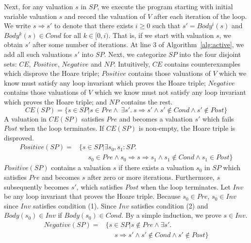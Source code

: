 Next, for any valuation $s$ in $SP$, we execute the program starting with initial variable valuation $s$ and record the valuation of $V$ after each iteration of the loop. We write $s \Rightarrow s'$ to denote that there exists $i \geq 0$ such that $s' = Body^i(s)$ and $Body^k(s) \in Cond$ for all $k \in [0, i)$. That is, if we start with valuation $s$, we obtain $s'$ after some number of iterations. At line 3 of Algorithm~\ref{alg:active}, we add all such valuations $s'$ into $SP$. Next, we categorize $SP$ into the four disjoint sets: $CE$, $Positive$, $Negative$ and $NP$. Intuitively, $CE$ contains counterexamples which disprove the Hoare triple; $Positive$ contains those valuations of $V$ which we know must satisfy any loop invariant which proves the Hoare triple; $Negative$ contains those valuations of $V$ which we know must not satisfy any loop invariant which proves the Hoare triple; and $NP$ contains the rest. %
\[
CE(SP) = \{s \in SP |s \in Pre \land~\exists s'.~s \Rightarrow s' \land s' \not \in Cond \land s' \not \in Post\} \]
A valuation in $CE(SP)$ satisfies $Pre$ and becomes a valuation $s'$ which fails $Post$ when the loop terminates. If $CE(SP)$ is non-empty, the Hoare triple is disproved.
\begin{align*}
Positive(SP) = & \{s \in SP | \exists s_0,s_1: SP. \\
& ~~~~~~ s_0 \in Pre \land s_0 \Rightarrow s \Rightarrow s_1 \land s_1 \not \in Cond \land s_1 \in Post\}
\end{align*}
$Positive(SP)$ contains a valuation $s$ if there exists a valuation $s_0$ in $SP$ which satisfies $Pre$ and becomes $s$ after zero or more iterations. Furthermore, $s$ subsequently becomes $s'$, which satisfies $Post$ when the loop terminates. Let $Inv$ be any loop invariant that proves the Hoare triple. Because $s_0 \in Pre$, $s_0 \in Inv$ since $Inv$ satisfies condition (1). Since $Inv$ satisfies condition (2) and $Body(s_0) \in Inv$ if $Body(s_0) \in Cond$. By a simple induction, we prove $s \in Inv$.
\begin{align*}
    Negative(SP) = & \{s \in SP | s \not \in Pre \land \exists s'. \\
    & ~~~~~~s \Rightarrow s' \land s' \not \in Cond \land s' \not \in Post\}
\end{align*}
